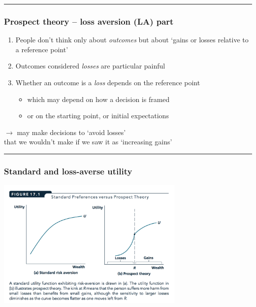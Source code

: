 \documentclass[]{article}
\providecommand{\tightlist}{%
  \setlength{\itemsep}{0pt}\setlength{\parskip}{0pt}}
\begin{document}
\begin{center}\rule{0.5\linewidth}{\linethickness}\end{center}

\hypertarget{prospect-theory-loss-aversion-la-part}{%
\subsubsection{Prospect theory -- loss aversion (LA) part}\label{prospect-theory-loss-aversion-la-part}}

\begin{enumerate}
\def\labelenumi{\arabic{enumi}.}
\tightlist
\item
  People don't think only about \emph{outcomes} but about `gains or losses relative to a reference point'
\item
  Outcomes considered \emph{losses} are particular painful
\item
  Whether an outcome is a \emph{loss} depends on the reference point

  \begin{itemize}
  \tightlist
  \item
    which may depend on how a decision is framed
  \item
    or on the starting point, or initial expectations
  \end{itemize}
\end{enumerate}

\bigskip

\(\rightarrow\) may make decisions to `avoid losses'\\
that we wouldn't make if we saw it as `increasing gains'

\begin{center}\rule{0.5\linewidth}{\linethickness}\end{center}

\hypertarget{standard-and-loss-averse-utility}{%
\subsubsection{Standard and loss-averse utility}\label{standard-and-loss-averse-utility}}

\includegraphics[height=2.5in]{picsfigs/std_u_prospect_u.png}
\end{document}
